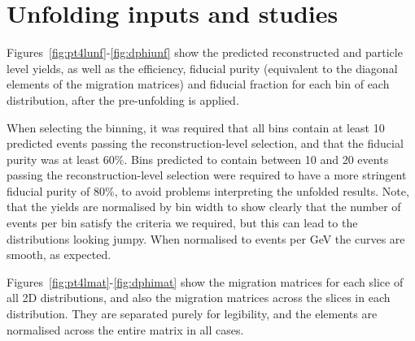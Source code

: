 \chapter{Unfolding inputs and studies}
Figures~\ref{fig:pt4lunf}-\ref{fig:dphiunf} show the predicted reconstructed and particle level yields, as well as the efficiency, fiducial purity (equivalent to the diagonal elements of the migration matrices) and fiducial fraction for each bin of each distribution, after the pre-unfolding is applied.  

When selecting the binning, it was required that all bins contain at least 10 predicted events passing the reconstruction-level selection, and that the fiducial purity was at least 60$\%$. Bins predicted to contain between 10 and 20 events passing the reconstruction-level selection were required to have a more stringent fiducial purity of 80$\%$, to avoid problems interpreting the unfolded results. Note, that the yields are normalised by bin width to show clearly that the number of events per bin satisfy the criteria we required, but this can lead to the distributions looking jumpy. When normalised to events per GeV the curves are smooth, as expected. 

Figures~\ref{fig:pt4lmat}-\ref{fig:dphimat} show the migration matrices for each slice of all 2D distributions, and also the migration matrices across the slices in each distribution. They are separated purely for legibility, and the elements are normalised across the entire matrix in all cases. 

